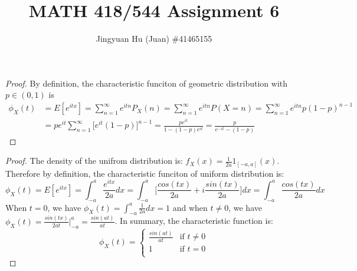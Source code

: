 \documentclass[10pt]{article}
\newenvironment{problem}[2][Problem]{\begin{trivlist}
\item[\hskip \labelsep {\bfseries #1}\hskip \labelsep {\bfseries #2.}]}{\end{trivlist}}
\begin{document}
 
\title{\vspace{-1.6cm}\large MATH 418/544 Assignment 6}
\author{\large Jingyuan Hu (Juan) \#41465155}
\date{}
\maketitle
 

\begin{problem}{1(a)}
\end{problem}
 
\begin{proof}
By definition, the characteristic funciton of geometric distribution with $p \in (0,1)$ is
\begin{equation}
\begin{split}
\phi_{X}(t) &= E[e^{itx}] = \sum_{n=1}^{\infty} e^{itn}P_{X}(n)= \sum_{n=1}^{\infty} e^{itn}P(X=n) = \sum_{n=1}^{\infty} e^{itn}p(1-p)^{n-1} \\
&= pe^{it}\sum_{n=1}^{\infty}\big[e^{it}(1-p)\big]^{n-1} = \frac{pe^{it}}{1-(1-p)e^{it}} = \frac{p}{e^{-it} - (1-p)}
\end{split}
\end{equation}
\end{proof}


\begin{problem}{1(b)}
\end{problem}
 
\begin{proof}
The density of the unifrom distribution is: $f_{X}(x) = \frac{1}{2a}1_{[-a,a]}(x)$.
Therefore by definition, the characteristic funciton of uniform distribution is:
\begin{equation}
\phi_{X}(t) = E[e^{itx}] = \int_{-a}^{a} \frac{e^{itx}}{2a}dx = \int_{-a}^{a} \big[\frac{cos(tx)}{2a}+i\frac{sin(tx)}{2a}\big]dx = \int_{-a}^{a} \frac{cos(tx)}{2a}dx
\end{equation}
When $t = 0$, we have $\phi_{X}(t) = \int_{-a}^{a} \frac{1}{2a} dx = 1$ and when $t \neq 0$, we have $\phi_{X}(t) = \frac{sin(tx)}{2at}|_{-a}^{a} = \frac{sin(at)}{at}$. In summary, the characteristic function is:
\[\phi_{X}(t)=
\begin{cases}
\frac{sin(at)}{at} & \text{if $t\neq0$} \\
1 & \text{if $t=0$} \\
\end{cases}
\]
\end{proof}
\end{document}
